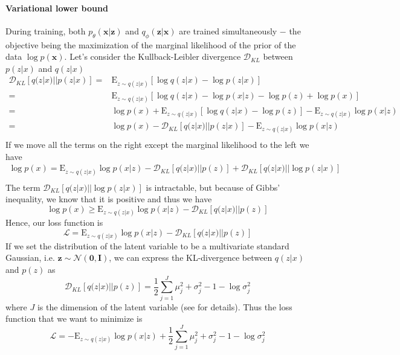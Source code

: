 \documentclass[10pt]{article}
\newcommand{\kldiv}{\mathcal{D}_{KL}}
\newcommand{\E}{\mathrm{E}}
\begin{document}
\paragraph{Variational lower bound} During training, both $p_\theta(\mathbf{x}|\mathbf{z})$ and $q_\phi(\mathbf{z}|\mathbf{x})$ are trained simultaneously $-$ the objective being the maximization of the marginal likelihood of the prior of the data $\log p(\mathbf{x})$. Let's consider the Kullback-Leibler divergence $\kldiv$ between $p(z|x)$ and $q(z|x)$
\begin{equation}
	\begin{split}
	\kldiv[q(z|x)||p(z|x)] 
	=& \E_{z\sim q(z|x)}[ \log q(z|x) - \log p(z|x)]\\
	=& \E_{z\sim q(z|x)}[ \log q(z|x) - \log p(x|z) - \log p(z) + \log p(x)]\\
	=& \log p(x) + \E_{z\sim q(z|x)}[ \log q(z|x)  - \log p(z)] - \E_{z\sim q(z|x)}\log p(x|z)\\
	=& \log p(x) - \kldiv[q(z|x)||p(z|x)] - \E_{z\sim q(z|x)}\log p(x|z)\\
	\end{split}
\end{equation}
If we move all the terms on the right except the marginal likelihood to the left we have
\begin{equation}
	\begin{split}
	\log p(x) = 
	\E_{z\sim q(z|x)}\log p(x|z)- \kldiv[q(z|x)||p(z)] + \kldiv[q(z|x)||\log p(z|x)]\\
	\end{split}
\end{equation}
The term $\kldiv[q(z|x)||\log p(z|x)]$ is intractable, but because of Gibbs' inequality, we know that it is positive and thus we have
\[
\log p(x)  \geq \E_{z\sim q(z|x)}\log p(x|z)- \kldiv[q(z|x)||p(z)]
\]
Hence, our loss function is
\[
\mathcal{L} = \E_{z\sim q(z|x)}\log p(x|z)- \kldiv[q(z|x)||p(z)]
\]
If we set the distribution of the latent variable to be a multivariate standard Gaussian, i.e. $\mathbf{z}\sim \mathcal{N}(\bm{0}, \mathbf{I})$, we can express the KL-divergence between $q(z|x)$ and $p(z)$ as
\begin{equation}
	\kldiv[q(z|x)||p(z)] 
	= \frac{1}{2}\sum_{j=1}^J \mu_j^2 + \sigma_j^2 - 1 - \log \sigma_j^2
\end{equation} 
where $J$ is the dimension of the latent variable (see \cite{kingma2013auto} for details). Thus the loss function that we want to minimize is
\begin{equation}
	\mathcal{L} 
	= -\E_{z\sim q(z|x)}\log p(x|z) + \frac{1}{2}\sum_{j=1}^J \mu_j^2 + \sigma_j^2 - 1 - \log \sigma_j^2
\end{equation}
\end{document}
